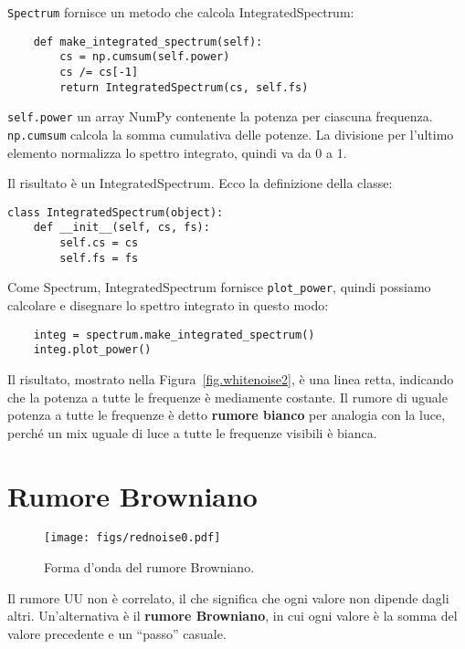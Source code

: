 \documentclass[12pt]{book} \usepackage[width=5.5in,height=8.5in, hmarginratio=3:2,vmarginratio=1:1]{geometry}
\begin{document}
{\tt Spectrum} fornisce un metodo che calcola IntegratedSpectrum:

\begin{verbatim} 
    def make_integrated_spectrum(self):
        cs = np.cumsum(self.power)
        cs /= cs[-1]
        return IntegratedSpectrum(cs, self.fs)
 \end{verbatim} 

{\tt self.power} un array NumPy contenente la potenza per ciascuna frequenza. {\tt np.cumsum} calcola la somma cumulativa delle potenze. La divisione per l'ultimo elemento normalizza lo spettro integrato, quindi va da 0 a 1.

Il risultato è un IntegratedSpectrum. Ecco la definizione della classe:

\begin{verbatim} 
class IntegratedSpectrum(object):
    def __init__(self, cs, fs):
        self.cs = cs
        self.fs = fs
 \end{verbatim} 

Come Spectrum, IntegratedSpectrum fornisce \verb"plot_power", quindi possiamo calcolare e disegnare lo spettro integrato in questo modo:

\begin{verbatim} 
    integ = spectrum.make_integrated_spectrum()
    integ.plot_power()
 \end{verbatim} 

Il risultato, mostrato nella Figura~\ref{fig.whitenoise2}, è una linea retta, indicando che la potenza a tutte le frequenze è mediamente costante. Il rumore di uguale potenza a tutte le frequenze è detto {\bf rumore bianco} per analogia con la luce, perché un mix uguale di luce a tutte le frequenze visibili è bianca.

\section{Rumore Browniano} \label{brownian} 

\begin{figure} 

\centerline{\texttt{[image: figs/rednoise0.pdf]}} \caption{Forma d'onda del rumore Browniano.} \label{fig.rednoise0} \end{figure} 

Il rumore UU non è correlato, il che significa che ogni valore non dipende dagli altri. Un'alternativa è il {\bf rumore Browniano}, in cui ogni valore è la somma del valore precedente e un ``passo'' casuale.
\end{document}
